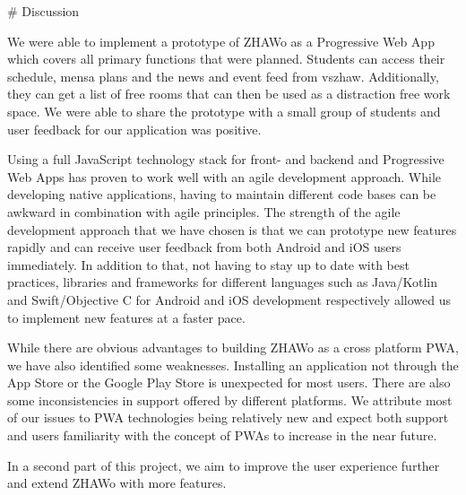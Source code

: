 \begin{markdown}

# Discussion

 We were able to implement a prototype of ZHAWo as a Progressive Web App which covers all primary functions that were planned. Students can access their schedule, mensa plans and the news and event feed from vszhaw. Additionally, they can get a list of free rooms that can then be used as a distraction free work space. We were able to share the prototype with a small group of students and user feedback for our application was positive.

Using a full JavaScript technology stack for front- and backend and Progressive Web Apps has proven to work well with an agile development approach. While developing native applications, having to maintain different code bases can be awkward in combination with agile principles. The strength of the agile development approach that we have chosen is that we can prototype new features rapidly and can receive user feedback from both Android and iOS users immediately. In addition to that, not having to stay up to date with best practices, libraries and frameworks for different languages such as Java/Kotlin and Swift/Objective C for Android and iOS development respectively allowed us to implement new features at a faster pace.

While there are obvious advantages to building ZHAWo as a cross platform PWA, we have also identified some weaknesses. Installing an application not through the App Store or the Google Play Store is unexpected for most users. There are also some inconsistencies in support offered by different platforms. We attribute most of our issues to PWA technologies being relatively new and expect both support and users familiarity with the concept of PWAs to increase in the near future.

In a second part of this project, we aim to improve the user experience further and extend ZHAWo with more features.

\end{markdown}

